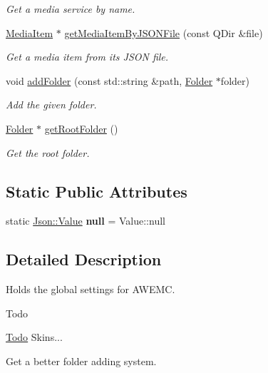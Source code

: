 \begin{DoxyCompactItemize}
\begin{DoxyCompactList}\small\item\em Get a media service by name. \end{DoxyCompactList}\item 
\hyperlink{class_a_w_e_1_1_media_item}{Media\-Item} $\ast$ \hyperlink{class_a_w_e_1_1_global_settings_ab13f95f4967f7058de61199ad48626ed}{get\-Media\-Item\-By\-J\-S\-O\-N\-File} (const Q\-Dir \&file)
\begin{DoxyCompactList}\small\item\em Get a media item from its J\-S\-O\-N file. \end{DoxyCompactList}\item 
void \hyperlink{class_a_w_e_1_1_global_settings_ac776a76c7c09678fa753e6561cafeda2}{add\-Folder} (const std\-::string \&path, \hyperlink{class_a_w_e_1_1_folder}{Folder} $\ast$folder)
\begin{DoxyCompactList}\small\item\em Add the given folder. \end{DoxyCompactList}\item 
\hyperlink{class_a_w_e_1_1_folder}{Folder} $\ast$ \hyperlink{class_a_w_e_1_1_global_settings_a958723c6d73aa7ab7574ba4c31675e5d}{get\-Root\-Folder} ()
\begin{DoxyCompactList}\small\item\em Get the root folder. \end{DoxyCompactList}\end{DoxyCompactItemize}
\subsection*{Static Public Attributes}
\begin{DoxyCompactItemize}
\item 
\hypertarget{class_a_w_e_1_1_global_settings_a4df7847cd94fe68cf28382f70eedb0b2}{static \hyperlink{class_json_1_1_value}{Json\-::\-Value} {\bfseries null} = Value\-::null}\label{class_a_w_e_1_1_global_settings_a4df7847cd94fe68cf28382f70eedb0b2}

\end{DoxyCompactItemize}


\subsection{Detailed Description}
Holds the global settings for A\-W\-E\-M\-C. 

\begin{DoxyRefDesc}{Todo}
\item[\hyperlink{todo__todo000006}{Todo}]Skins... 

Get a better folder adding system.\end{DoxyRefDesc}


